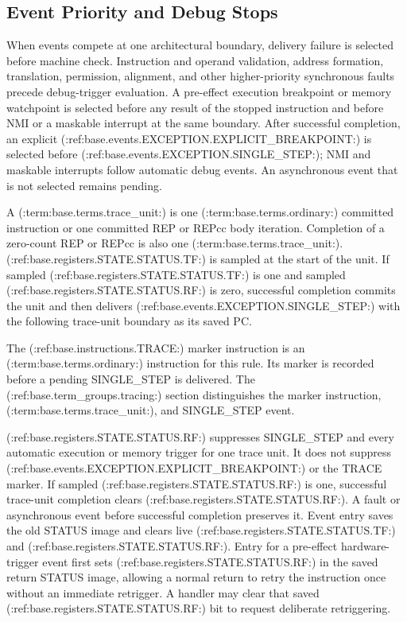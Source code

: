 \subsection{Event Priority and Debug Stops}\label{section:event-priority-and-debug}
When events compete at one architectural boundary, delivery failure is selected before machine check. Instruction
and operand validation, address formation, translation, permission, alignment, and other higher-priority synchronous
faults precede debug-trigger evaluation. A pre-effect execution breakpoint or memory watchpoint is selected before
any result of the stopped instruction and before NMI or a maskable interrupt at the same boundary. After successful
completion, an explicit (:ref:base.events.EXCEPTION.EXPLICIT_BREAKPOINT:) is selected before
(:ref:base.events.EXCEPTION.SINGLE_STEP:); NMI and maskable interrupts follow automatic debug events. An asynchronous
event that is not selected remains pending.

A (:term:base.terms.trace_unit:) is one (:term:base.terms.ordinary:) committed instruction or one committed REP or
REPcc body iteration. Completion of a zero-count REP or REPcc is also one (:term:base.terms.trace_unit:). (:ref:base.registers.STATE.STATUS.TF:) is
sampled at the start of the unit. If sampled (:ref:base.registers.STATE.STATUS.TF:) is one and sampled (:ref:base.registers.STATE.STATUS.RF:) is zero, successful completion commits the unit
and then delivers (:ref:base.events.EXCEPTION.SINGLE_STEP:) with the following trace-unit boundary as its saved PC.

The (:ref:base.instructions.TRACE:) marker instruction is an (:term:base.terms.ordinary:) instruction for this rule.
Its marker is recorded before a pending SINGLE\_STEP is delivered. The (:ref:base.term_groups.tracing:) section
distinguishes the marker instruction, (:term:base.terms.trace_unit:), and SINGLE\_STEP event.

(:ref:base.registers.STATE.STATUS.RF:) suppresses SINGLE\_STEP and every automatic execution or memory trigger for one trace unit. It does not suppress
(:ref:base.events.EXCEPTION.EXPLICIT_BREAKPOINT:) or the TRACE marker. If sampled (:ref:base.registers.STATE.STATUS.RF:) is one, successful trace-unit
completion clears (:ref:base.registers.STATE.STATUS.RF:). A fault or asynchronous event before successful completion preserves it. Event entry saves the
old STATUS image and clears live (:ref:base.registers.STATE.STATUS.TF:) and (:ref:base.registers.STATE.STATUS.RF:). Entry for a pre-effect hardware-trigger event first sets (:ref:base.registers.STATE.STATUS.RF:) in the saved
return STATUS image, allowing a normal return to retry the instruction once without an immediate retrigger. A handler
may clear that saved (:ref:base.registers.STATE.STATUS.RF:) bit to request deliberate retriggering.
